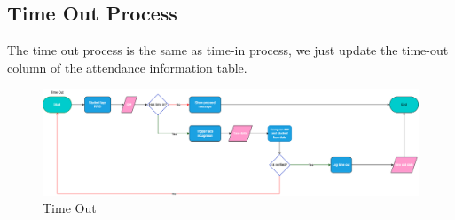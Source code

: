 \clearpage
\subsection{Time Out Process}
The time out process is the same as time-in process, we just update the time-out column of the attendance information table.
\begin{figure}[h] %
	\centering
	\includegraphics[width=1.0\textwidth]{figures/chapter4/timeout1.png} %
	\caption{Time Out}
	\label{fig:timeout}
\end{figure}

